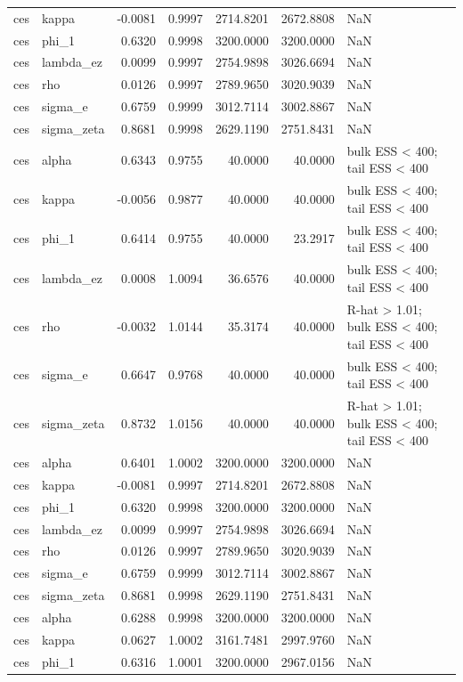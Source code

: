 \begin{tabular}{llrrrrl}
ces & kappa & -0.0081 & 0.9997 & 2714.8201 & 2672.8808 & NaN \\
ces & phi\_1 & 0.6320 & 0.9998 & 3200.0000 & 3200.0000 & NaN \\
ces & lambda\_ez & 0.0099 & 0.9997 & 2754.9898 & 3026.6694 & NaN \\
ces & rho & 0.0126 & 0.9997 & 2789.9650 & 3020.9039 & NaN \\
ces & sigma\_e & 0.6759 & 0.9999 & 3012.7114 & 3002.8867 & NaN \\
ces & sigma\_zeta & 0.8681 & 0.9998 & 2629.1190 & 2751.8431 & NaN \\
ces & alpha & 0.6343 & 0.9755 & 40.0000 & 40.0000 & bulk ESS < 400; tail ESS < 400 \\
ces & kappa & -0.0056 & 0.9877 & 40.0000 & 40.0000 & bulk ESS < 400; tail ESS < 400 \\
ces & phi\_1 & 0.6414 & 0.9755 & 40.0000 & 23.2917 & bulk ESS < 400; tail ESS < 400 \\
ces & lambda\_ez & 0.0008 & 1.0094 & 36.6576 & 40.0000 & bulk ESS < 400; tail ESS < 400 \\
ces & rho & -0.0032 & 1.0144 & 35.3174 & 40.0000 & R-hat > 1.01; bulk ESS < 400; tail ESS < 400 \\
ces & sigma\_e & 0.6647 & 0.9768 & 40.0000 & 40.0000 & bulk ESS < 400; tail ESS < 400 \\
ces & sigma\_zeta & 0.8732 & 1.0156 & 40.0000 & 40.0000 & R-hat > 1.01; bulk ESS < 400; tail ESS < 400 \\
ces & alpha & 0.6401 & 1.0002 & 3200.0000 & 3200.0000 & NaN \\
ces & kappa & -0.0081 & 0.9997 & 2714.8201 & 2672.8808 & NaN \\
ces & phi\_1 & 0.6320 & 0.9998 & 3200.0000 & 3200.0000 & NaN \\
ces & lambda\_ez & 0.0099 & 0.9997 & 2754.9898 & 3026.6694 & NaN \\
ces & rho & 0.0126 & 0.9997 & 2789.9650 & 3020.9039 & NaN \\
ces & sigma\_e & 0.6759 & 0.9999 & 3012.7114 & 3002.8867 & NaN \\
ces & sigma\_zeta & 0.8681 & 0.9998 & 2629.1190 & 2751.8431 & NaN \\
ces & alpha & 0.6288 & 0.9998 & 3200.0000 & 3200.0000 & NaN \\
ces & kappa & 0.0627 & 1.0002 & 3161.7481 & 2997.9760 & NaN \\
ces & phi\_1 & 0.6316 & 1.0001 & 3200.0000 & 2967.0156 & NaN \\

\end{tabular}
